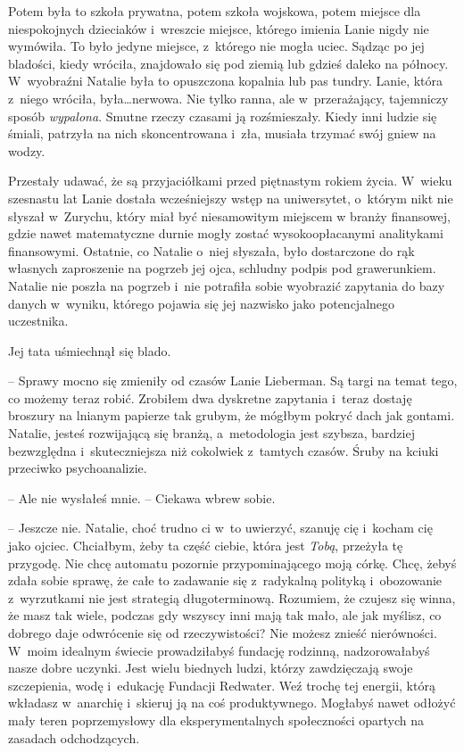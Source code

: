 \documentclass[oneside,polish,11pt,sfheadings]{mwbk}
\begin{document}
Potem była to szkoła prywatna, potem szkoła wojskowa, potem miejsce dla
niespokojnych dzieciaków i~wreszcie miejsce, którego imienia Lanie nigdy
nie wymówiła. To było jedyne miejsce, z~którego nie mogła uciec. Sądząc
po jej bladości, kiedy wróciła, znajdowało się pod ziemią lub gdzieś
daleko na północy. W~wyobraźni Natalie była to opuszczona kopalnia lub
pas tundry. Lanie, która z~niego wróciła, była\ldots  nerwowa. Nie tylko
ranna, ale w~przerażający, tajemniczy sposób \textit{wypalona}. Smutne
rzeczy czasami ją rozśmieszały. Kiedy inni ludzie się śmiali, patrzyła
na nich skoncentrowana i~zła, musiała trzymać swój gniew na wodzy.

Przestały udawać, że są przyjaciółkami przed piętnastym rokiem życia. W~wieku szesnastu lat Lanie dostała wcześniejszy wstęp na uniwersytet, o~którym nikt nie słyszał w~Zurychu, który miał być niesamowitym miejscem
w branży finansowej, gdzie nawet matematyczne durnie mogły zostać
wysokoopłacanymi analitykami finansowymi. Ostatnie, co Natalie o~niej
słyszała, było dostarczone do rąk własnych zaproszenie na pogrzeb jej
ojca, schludny podpis pod grawerunkiem. Natalie nie poszła na pogrzeb i~nie potrafiła sobie wyobrazić zapytania do bazy danych w~wyniku, którego
pojawia się jej nazwisko jako potencjalnego uczestnika.

Jej tata uśmiechnął się blado. 

-- Sprawy mocno się zmieniły od czasów
Lanie Lieberman. Są targi na temat tego, co możemy teraz robić. Zrobiłem
dwa dyskretne zapytania i~teraz dostaję broszury na lnianym papierze tak
grubym, że mógłbym pokryć dach jak gontami. Natalie, jesteś rozwijającą
się branżą, a~metodologia jest szybsza, bardziej bezwzględna i~skuteczniejsza niż cokolwiek z~tamtych czasów. Śruby na kciuki przeciwko
psychoanalizie.

-- Ale nie wysłałeś mnie. -- Ciekawa wbrew sobie.

-- Jeszcze nie. Natalie, choć trudno ci w~to uwierzyć, szanuję cię i~kocham cię jako ojciec. Chciałbym, żeby ta część ciebie, która jest
\textit{Tobą}, przeżyła tę przygodę. Nie chcę automatu pozornie
przypominającego moją córkę. Chcę, żebyś zdała sobie sprawę, że całe to
zadawanie się z~radykalną polityką i~obozowanie z~wyrzutkami nie jest
strategią długoterminową. Rozumiem, że czujesz się winna, że masz tak
wiele, podczas gdy wszyscy inni mają tak mało, ale jak myślisz, co
dobrego daje odwrócenie się od rzeczywistości? Nie możesz znieść
nierówności. W~moim idealnym świecie prowadziłabyś fundację rodzinną,
nadzorowałabyś nasze dobre uczynki. Jest wielu biednych ludzi, którzy
zawdzięczają swoje szczepienia, wodę i~edukację Fundacji Redwater. Weź
trochę tej energii, którą wkładasz w~anarchię i~skieruj ją na coś
produktywnego. Mogłabyś nawet odłożyć mały teren poprzemysłowy dla
eksperymentalnych społeczności opartych na zasadach odchodzących.
\end{document}
